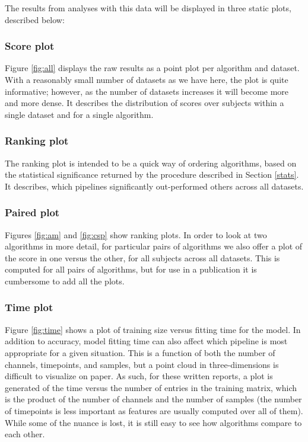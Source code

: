 The results from analyses with this data will be displayed in three
static plots, described below:

\subsubsection{Score plot}
Figure \ref{fig:all} displays the raw results as a point plot per algorithm and
dataset. With a reasonably small number of datasets as we have here, the plot is
quite informative; however, as the number of datasets increases it will become
more and more dense. It describes the distribution of scores over subjects
within a single dataset and for a single algorithm.

\subsubsection{Ranking plot}
The ranking
plot is intended to be a quick way of ordering algorithms, based on
the statistical significance returned by the procedure described in
Section \ref{stats}. It describes, which pipelines significantly
out-performed others across all datasets.

\subsubsection{Paired plot}
Figures \ref{fig:am} and \ref{fig:csp} show ranking plots. In order to
look at two algorithms in more detail, for particular pairs of
algorithms we also offer a plot of the score in one versus the other,
for all subjects across all datasets. This is computed for all pairs
of algorithms, but for use in a publication it is cumbersome to add
all the plots.

\subsubsection{Time plot}
Figure \ref{fig:time} shows a plot of training size versus fitting
time for the model. In addition to accuracy, model fitting time can also affect which
pipeline is most appropriate for a given situation. This is a function
of both the number of channels, timepoints, and samples, but a point
cloud in three-dimensions is difficult to visualize on paper. As such,
for these written reports, a plot is generated of the time versus the
number of entries in the training matrix, which is the product of the
number of channels and the number of samples (the number of timepoints
is less important as features are usually computed over all of
them). While some of the nuance is lost, it is still easy to see how
algorithms compare to each other.

